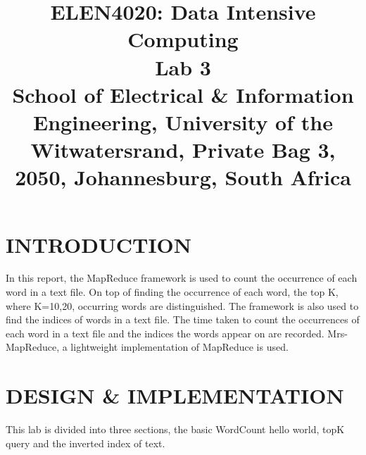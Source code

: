 \documentclass[conference]{IEEEtran}
\begin{document}
\title{ELEN4020: Data Intensive Computing\\ Lab 3\\
{\footnotesize School of Electrical \& Information Engineering, University of the
Witwatersrand, Private Bag 3, 2050, Johannesburg, South Africa}
}


\author{

\and
{}
\and
{}

}

\maketitle

\section{INTRODUCTION}
In this report, the MapReduce framework is used to count the occurrence of each word in a text file. On top of finding the occurrence of each word, the top K, where K=10,20, occurring words are distinguished. The framework is also used to find the indices of words in a text file. The time taken to count the occurrences of each word in a text file and the indices the words appear on are recorded. Mrs-MapReduce, a lightweight implementation of MapReduce is used. 



%
\section{DESIGN \& IMPLEMENTATION}
This lab is divided into three sections, the basic WordCount hello world, topK query and the inverted index of text.
\end{document}
